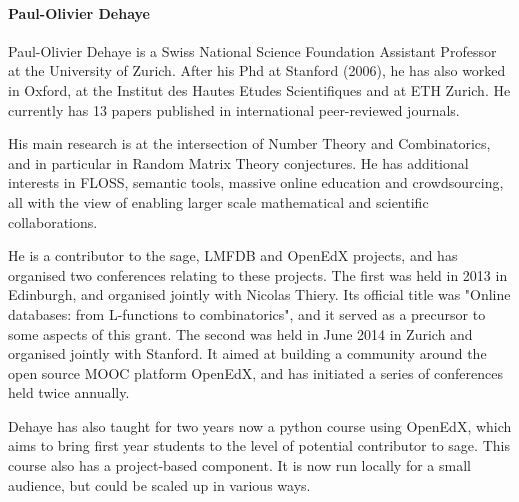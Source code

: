 \paragraph{Paul-Olivier Dehaye}

% 
%

%


Paul-Olivier Dehaye is a Swiss National Science Foundation Assistant Professor 
at the University of Zurich. After his Phd at Stanford (2006), he has also worked in Oxford, 
at the Institut des Hautes Etudes Scientifiques and at ETH Zurich. He currently has 13 
papers published in international peer-reviewed journals. 

His main research is at the intersection of Number Theory and Combinatorics, and in 
particular in Random Matrix Theory conjectures. He has additional interests in FLOSS, 
semantic tools, massive online education and crowdsourcing, all with the view of 
enabling larger scale mathematical and scientific collaborations. 

He is a contributor to the sage, LMFDB and OpenEdX projects, and has organised two 
conferences relating to these projects. The first was held in 2013 in Edinburgh, and organised
jointly with Nicolas Thiery. Its official title was  "Online databases: from L-functions to combinatorics", 
and it served as a precursor to some aspects of this grant. The second was held in June 2014 
in Zurich and organised jointly with Stanford. It aimed at building a community around the open 
source MOOC platform OpenEdX, and has initiated a series of conferences held twice annually. 

Dehaye has also taught for two years now a python course using OpenEdX, which aims to bring 
first year students to the level of potential contributor to sage. This course also has a 
project-based component. It is now run locally for a small audience, but could be scaled up 
in various ways. 

